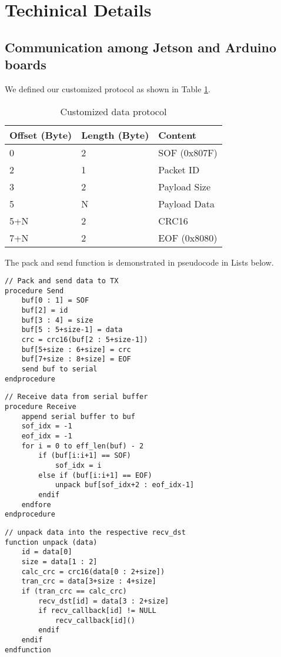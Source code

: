 
\section{Techinical Details}
\subsection{Communication among Jetson and Arduino boards}
We defined our customized protocol as shown in Table \ref{tab:com_protocol}.
\begin{table}[h]
    \centering
    \begin{tabular}{|p{1in}|p{1in}|p{3in}|}
        \hline 
        Offset (Byte) & Length (Byte) & Content \\ \hline 
        0 & 2 & SOF (0x807F) \\ \hline 
        2 & 1 & Packet ID \\ \hline
        3 & 2 & Payload Size \\ \hline
        5 & N & Payload Data \\ \hline
        5+N & 2 & CRC16 \\ \hline 
        7+N & 2 & EOF (0x8080) \\ \hline 
    \end{tabular}
    \caption{Customized data protocol}
    \label{tab:com_protocol}
\end{table}

The pack and send function is demonstrated in pseudocode in Lists below.

\begin{lstlisting}
// Pack and send data to TX 
procedure Send
    buf[0 : 1] = SOF
    buf[2] = id
    buf[3 : 4] = size
    buf[5 : 5+size-1] = data
    crc = crc16(buf[2 : 5+size-1])
    buf[5+size : 6+size] = crc
    buf[7+size : 8+size] = EOF
    send buf to serial
endprocedure 
\end{lstlisting}

\begin{lstlisting}
// Receive data from serial buffer
procedure Receive
    append serial buffer to buf
    sof_idx = -1
    eof_idx = -1
    for i = 0 to eff_len(buf) - 2
        if (buf[i:i+1] == SOF)
            sof_idx = i
        else if (buf[i:i+1] == EOF) 
            unpack buf[sof_idx+2 : eof_idx-1]
        endif
    endfore 
endprocedure 
\end{lstlisting}

\begin{lstlisting}
// unpack data into the respective recv_dst
function unpack (data)
    id = data[0]
    size = data[1 : 2]
    calc_crc = crc16(data[0 : 2+size])
    tran_crc = data[3+size : 4+size]
    if (tran_crc == calc_crc)
        recv_dst[id] = data[3 : 2+size]
        if recv_callback[id] != NULL
            recv_callback[id]()
        endif
    endif
endfunction
\end{lstlisting}

